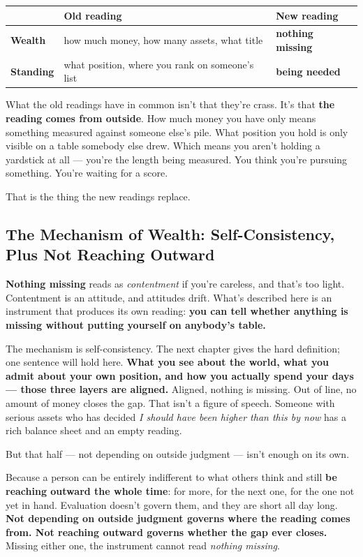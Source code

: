 \documentclass[11pt,a4paper]{article}
\begin{document}
\begin{center}

\begin{tabularx}{\textwidth}{lXX}
\toprule
 & Old reading & New reading \\
\midrule
\textbf{Wealth} & how much money, how many assets, what title & \textbf{nothing missing} \\
\textbf{Standing} & what position, where you rank on someone's list & \textbf{being needed} \\
\bottomrule
\end{tabularx}
\end{center}

What the old readings have in common isn't that they're crass. It's that \textbf{the reading comes from outside}. How much money you have only means something measured against someone else's pile. What position you hold is only visible on a table somebody else drew. Which means you aren't holding a yardstick at all --- you're the length being measured. You think you're pursuing something. You're waiting for a score.

That is the thing the new readings replace.

\subsection{The Mechanism of Wealth: Self-Consistency, Plus Not Reaching Outward}

\textbf{Nothing missing} reads as \textit{contentment} if you're careless, and that's too light. Contentment is an attitude, and attitudes drift. What's described here is an instrument that produces its own reading: \textbf{you can tell whether anything is missing without putting yourself on anybody's table.}

The mechanism is self-consistency. The next chapter gives the hard definition; one sentence will hold here. \textbf{What you see about the world, what you admit about your own position, and how you actually spend your days --- those three layers are aligned.} Aligned, nothing is missing. Out of line, no amount of money closes the gap. That isn't a figure of speech. Someone with serious assets who has decided \textit{I should have been higher than this by now} has a rich balance sheet and an empty reading.

But that half --- not depending on outside judgment --- isn't enough on its own.

Because a person can be entirely indifferent to what others think and still \textbf{be reaching outward the whole time}: for more, for the next one, for the one not yet in hand. Evaluation doesn't govern them, and they are short all day long. \textbf{Not depending on outside judgment governs where the reading comes from. Not reaching outward governs whether the gap ever closes.} Missing either one, the instrument cannot read \textit{nothing missing}.
\end{document}
